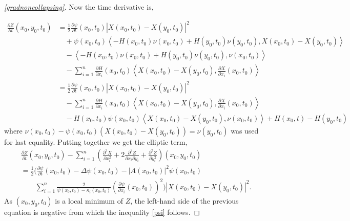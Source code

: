 \begin{proof}[\cref{gradnoncollapsing}]
    Now the time derivative is,
    
    \begin{align*}
        \frac{\partial Z}{\partial t}(x_{0},y_{0},t_{0}) & = \frac{1}{2} \frac{\partial \psi}{\partial t}(x_{0},t_{0})|X(x_{0},t_{0})-X(y_{0},t_{0})|^{2} \\
        & \quad + \psi(x_{0},t_{0}) \left< -H(x_{0},t_{0})\nu(x_{0},t_{0})+H(y_{0},t_{0})\nu(y_{0},t_{0}), X(x_{0},t_{0})-X(y_{0},t_{0}) \right>  \\
        &\quad - \left< -H(x_{0},t_{0})\nu(x_{0},t_{0})+H(y_{0},t_{0})\nu(y_{0},t_{0}), \nu (x_{0},t_{0}) \right> \\
        & \quad - \sum_{i=1}^{n} \frac{\partial H}{\partial x_{i}}(x_{0},t_{0}) \left< X(x_{0},t_{0})-X(y_{0},t_{0}), \frac{\partial X}{\partial x_{i}}(x_{0},t_{0}) \right> \\
        & = \frac{1}{2} \frac{\partial \psi}{\partial t}(x_{0},t_{0})|X(x_{0},t_{0})-X(y_{0},t_{0})|^{2} \\
        & \quad - \sum_{i=1}^{n} \frac{\partial H}{\partial x_{i}}(x_{0},t_{0})\left< X(x_{0},t_{0})-X(y_{0},t_{0}), \frac{\partial X}{\partial x_{i}}(x_{0},t_{0}) \right> \\ 
        & \quad -H(x_{0},t_{0})\psi(x_{0},t_{0})\left< X(x_{0},t_{0})-X(y_{0},t_{0}), \nu(x_{0},t_{0}) \right> + H(x_{0},t)-H(y_{0},t_{0})
    \end{align*}
    where $ \nu(x_{0},t_{0}) - \psi(x_{0},t_{0})(X(x_{0},t_{0})-X(y_{0},t_{0})) =\nu(y_{0},t_{0})  $ was used for last equality. Putting together we get the elliptic term, \begin{align*}
        & \frac{\partial Z}{\partial t}(x_{0},y_{0},t_{0}) - \sum_{i=1}^{n}\left( \frac{\partial^{2} X}{\partial x_{i}^{2}} + 2 \frac{\partial^{2}Z}{\partial x_{i}\partial y_{i}} + \frac{\partial^{2} Z}{\partial y_{i}^{2}} \right)(x_{0},y_{0},t_{0}) \\
        & = \frac{1}{2}\bigg( \frac{\partial \psi}{\partial t}(x_{0},t_{0}) - \Delta \psi(x_{0},t_{0}) - |A(x_{0},t_{0})|^{2} \psi(x_{0},t_{0}) \\
        & \qquad \sum_{i=1}^{n} \frac{2}{\psi(x_{0},t_{0})-\kappa_{i}(x_{0},t_{0})}\left( \frac{\partial \psi}{\partial x_{i}}(x_{0},t_{0}) \right)^{2} \bigg)|X(x_{0},t_{0})-X(y_{0},t_{0})|^{2}.
    \end{align*}
    As $ (x_{0},y_{0},t_{0}) $ is a local minimum of $ Z $, the left-hand side of the previous equation is negative from which the inequality \cref{psi} follows. 
\end{proof} 
    
